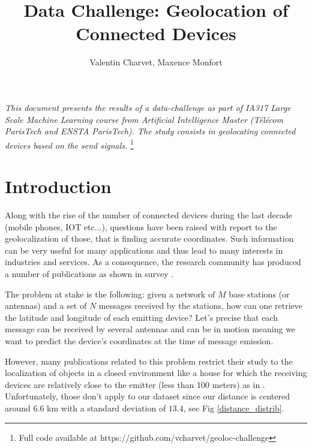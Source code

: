 \documentclass[twocolumn,2pt]{article}
\title{Data Challenge: Geolocation of Connected Devices}
\author{Valentin Charvet, Maxence Monfort}
\begin{document}
	\maketitle
	\hspace{2cm}
	
	
	\textit{This document presents the results of a data-challenge as part of IA317 Large Scale Machine Learning course from Artificial Intelligence Master (Télécom ParisTech and ENSTA ParisTech). The study consists in geolocating connected devices based on the send signals.}	
	\footnote{Full code available at https://github.com/vcharvet/geoloc-challenge }
		
	
	\section{Introduction}
	Along with the rise of the number of connected devices during the last decade (mobile phones, IOT etc...), questions have been raised with report to the geolocalization of those, that is finding accurate coordinates. Such information can be very useful for many applications and thus lead to many interests in industries and services. As a consequence, the research community has produced a number of publications as shown in survey \cite{roxin:hal-00470120}.
	
	The problem at stake is the following: given a network of $M$ base stations (or antennas) and a set of $N$ messages received by the stations, how can one retrieve the latitude and longitude of each emitting device? Let's precise that each message can be received by several antennas and can be in motion meaning we want to predict the device's coordinates at the time of message emission.
	
	However, many publications related to this problem restrict their study to the localization of objects in a closed environment like a house for which the receiving devices are relatively close to the emitter (less than 100 meters) as in \cite{he2013testbed}. Unfortunately, those don't apply to our dataset since our distance is centered around $6.6$ km with a standard deviation of $13.4$, see  Fig \ref{distance_distrib}.
	
\end{document}
